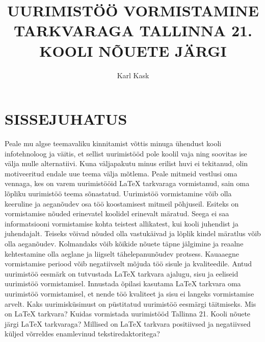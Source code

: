 \documentclass{21kuur}
\title{UURIMIST\"{O}\"{O} VORMISTAMINE \latex TARKVARAGA TALLINNA 21. KOOLI N\~{O}UETE J\"{A}RGI}
\author{Karl Kask}
\begin{document}
\maketitle
\tableofcontents

\newpage
\chapter*{SISSEJUHATUS}
Peale mu algse teemavaliku kinnitamist v\~{o}ttis minuga \"{u}hendust kooli infotehnoloog ja v\"{a}itis, et sellist uurimist\"{o}\"{o}d pole koolil vaja ning soovitas ise v\"{a}lja mulle alternatiivi. Kuna v\"{a}ljapakutu minus erilist huvi ei tekitanud, olin motiveeritud endale uue teema v\"{a}lja m\~{o}tlema. Peale mitmeid vestlusi oma vennaga, kes on varem uurimist\"{o}\"{o}id LaTeX tarkvaraga vormistanud, sain oma l\~{o}pliku uurimist\"{o}\"{o} teema s\~{o}nastatud.
Uurimist\"{o}\"{o} vormistamine v\~{o}ib olla keeruline ja aegan\~{o}udev osa t\"{o}\"{o} koostamisest mitmeil p\~{o}hjuseil. Esiteks on vormistamise n\~{o}uded erinevatel koolidel erinevalt m\"{a}ratud. Seega ei saa informatsiooni vormistamise kohta teistest allikatest, kui kooli juhendist ja juhendajalt. Teiseks v\~{o}ivad n\~{o}uded olla vastuk\"{a}ivad ja l\~{o}plik kindel m\"{a}ratlus v\~{o}ib olla aegan\~{o}udev. Kolmandaks v\~{o}ib k\~{o}ikide n\~{o}uete t\"{a}pne j\"{a}lgimine ja reaalne kehtestamine olla aeglane ja liigselt t\"{a}helepanun\~{o}udev protsess. Kauaaegne vormistamise periood v\~{o}ib negatiivselt m\~{o}juda t\"{o}\"{o} sisule ja kvaliteedile.
Antud uurimist\"{o}\"{o} eesm\"{a}rk on tutvustada LaTeX tarkvara ajalugu, sisu ja eeliseid uurimist\"{o}\"{o} vormistamisel. Innustada \~{o}pilasi kasutama LaTeX tarkvara oma uurimist\"{o}\"{o} vormistamisel, et nende t\"{o}\"{o} kvaliteet ja sisu ei langeks vormistamise arvelt. 
Kaks uurimisk\"{u}simust on p\"{u}stitatud uurimist\"{o}\"{o} eesm\"{a}rgi t\"{a}itmiseks. Mis on LaTeX tarkvara? Kuidas vormistada uurimist\"{o}\"{o}d Tallinna 21. Kooli n\~{o}uete j\"{a}rgi LaTeX tarkvaraga? Millised on LaTeX tarkvara positiivsed ja negatiivsed k\"{u}ljed v\~{o}rreldes enamlevinud tekstiredaktoritega?
\newpage
\end{document}
